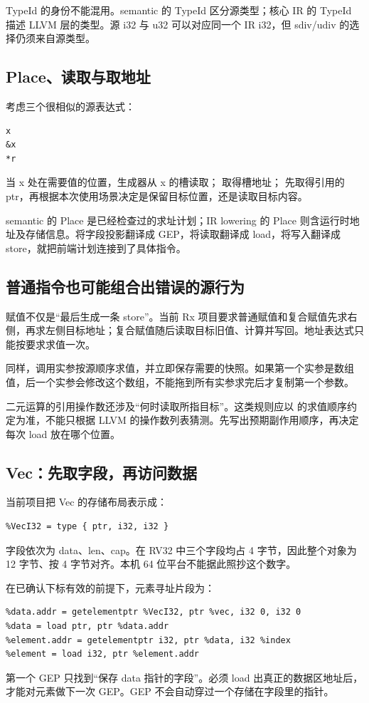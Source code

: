 TypeId 的身份不能混用。semantic 的 TypeId 区分源类型；核心 IR 的 TypeId 描述 LLVM 层的类型。源 i32 与 u32 可以对应同一个 IR i32，但 sdiv/udiv 的选择仍须来自源类型。

\subsection{Place、读取与取地址}
考虑三个很相似的源表达式：
\begin{lstlisting}[language=Rx,numbers=none]
x
&x
*r
\end{lstlisting}
当 x 处在需要值的位置，生成器从 x 的槽读取； 取得槽地址； 先取得引用的 ptr，再根据本次使用场景决定是保留目标位置，还是读取目标内容。

semantic 的 Place 是已经检查过的求址计划；IR lowering 的 Place 则含运行时地址及存储信息。将字段投影翻译成 GEP，将读取翻译成 load，将写入翻译成 store，就把前端计划连接到了具体指令。

\subsection{普通指令也可能组合出错误的源行为}
赋值不仅是“最后生成一条 store”。当前 Rx 项目要求普通赋值和复合赋值先求右侧，再求左侧目标地址；复合赋值随后读取目标旧值、计算并写回。地址表达式只能按要求求值一次。

同样，调用实参按源顺序求值，并立即保存需要的快照。如果第一个实参是数组值，后一个实参会修改这个数组，不能拖到所有实参求完后才复制第一个参数。

二元运算的引用操作数还涉及“何时读取所指目标”。这类规则应以  的求值顺序约定为准，不能只根据 LLVM 的操作数列表猜测。先写出预期副作用顺序，再决定每次 load 放在哪个位置。

\subsection{Vec：先取字段，再访问数据}
当前项目把 Vec 的存储布局表示成：
\begin{lstlisting}
%VecI32 = type { ptr, i32, i32 }
\end{lstlisting}
字段依次为 data、len、cap。在 RV32 中三个字段均占 4 字节，因此整个对象为 12 字节、按 4 字节对齐。本机 64 位平台不能据此照抄这个数字。

在已确认下标有效的前提下，元素寻址片段为：
\begin{lstlisting}
%data.addr = getelementptr %VecI32, ptr %vec, i32 0, i32 0
%data = load ptr, ptr %data.addr
%element.addr = getelementptr i32, ptr %data, i32 %index
%element = load i32, ptr %element.addr
\end{lstlisting}
第一个 GEP 只找到“保存 data 指针的字段”。必须 load 出真正的数据区地址后，才能对元素做下一次 GEP。GEP 不会自动穿过一个存储在字段里的指针。

